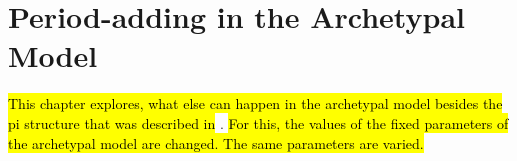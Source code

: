 \chapter{Period-adding in the Archetypal Model}
\label{chap:add}

\hl{This chapter explores, what else can happen in the archetypal model besides the \gls{pi} structure that was described in} .
\hl{
	For this, the values of the fixed parameters of the archetypal model are changed.
	The same parameters are varied.
}


\clearpage

\clearpage

